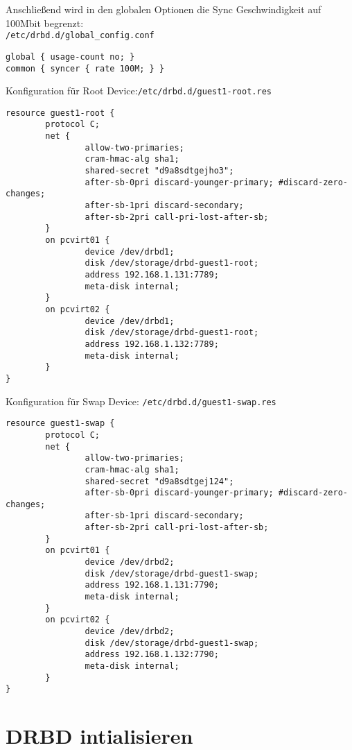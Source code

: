 Anschließend wird in den globalen Optionen die Sync Geschwindigkeit auf 100Mbit begrenzt:
\\
\verb|/etc/drbd.d/global_config.conf|
\setupVerbatimOut
\begin{verbatim}
global { usage-count no; }
common { syncer { rate 100M; } }
\end{verbatim}

Konfiguration für Root Device:\verb|/etc/drbd.d/guest1-root.res|
\setupVerbatimOut
\begin{verbatim}
resource guest1-root {
        protocol C;
        net {
                allow-two-primaries;
                cram-hmac-alg sha1;
                shared-secret "d9a8sdtgejho3";
                after-sb-0pri discard-younger-primary; #discard-zero-changes;
                after-sb-1pri discard-secondary;
                after-sb-2pri call-pri-lost-after-sb;
        }
        on pcvirt01 {
                device /dev/drbd1;
                disk /dev/storage/drbd-guest1-root;
                address 192.168.1.131:7789;
                meta-disk internal;
        }
        on pcvirt02 {
                device /dev/drbd1;
                disk /dev/storage/drbd-guest1-root;
                address 192.168.1.132:7789;
                meta-disk internal;
        }
}
\end{verbatim}

Konfiguration für Swap Device: \verb|/etc/drbd.d/guest1-swap.res|
\setupVerbatimOut
\begin{verbatim}
resource guest1-swap {
        protocol C;
        net {
                allow-two-primaries;
                cram-hmac-alg sha1;
                shared-secret "d9a8sdtgej124";
                after-sb-0pri discard-younger-primary; #discard-zero-changes;
                after-sb-1pri discard-secondary;
                after-sb-2pri call-pri-lost-after-sb;
        }
        on pcvirt01 {
                device /dev/drbd2;
                disk /dev/storage/drbd-guest1-swap;
                address 192.168.1.131:7790;
                meta-disk internal;
        }
        on pcvirt02 {
                device /dev/drbd2;
                disk /dev/storage/drbd-guest1-swap;
                address 192.168.1.132:7790;
                meta-disk internal;
        }
}
\end{verbatim}


\section{DRBD intialisieren}

